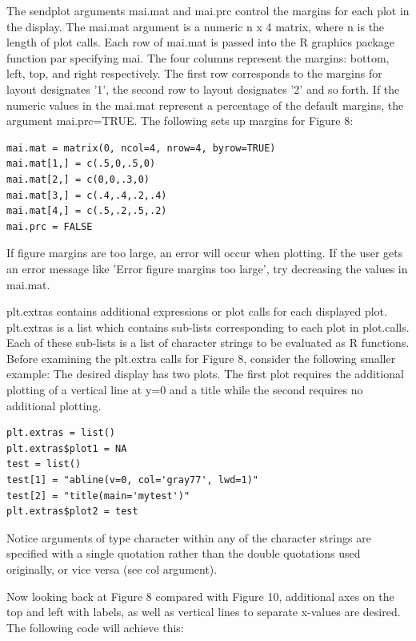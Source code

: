 \documentclass[]{article}
\begin{document}
\indent The sendplot arguments mai.mat and mai.prc control the margins for each plot in the display. The mai.mat argument is a numeric n x 4 matrix, where n is the length of plot calls. Each row of mai.mat is passed into the R graphics package function par specifying mai. The four columns represent the margins: bottom, left, top, and right respectively. The first row corresponds to the margins for layout designates '1', the second row to layout designates '2' and so forth. If the numeric values in the mai.mat represent a percentage of the default margins, the argument mai.prc=TRUE. The following sets up margins for Figure 8:
\begin{verbatim}
mai.mat = matrix(0, ncol=4, nrow=4, byrow=TRUE)
mai.mat[1,] = c(.5,0,.5,0)
mai.mat[2,] = c(0,0,.3,0)
mai.mat[3,] = c(.4,.4,.2,.4)
mai.mat[4,] = c(.5,.2,.5,.2)
mai.prc = FALSE
\end{verbatim}



 If figure margins are too large, an error will occur when plotting.  If the user gets an error message like 'Error figure margins too large', try decreasing the values in mai.mat.


\indent plt.extras contains additional expressions or plot calls for each displayed plot. plt.extras is a list which contains sub-lists corresponding to each plot in plot.calls. Each of these sub-lists is a list of character strings to be evaluated as R functions. Before examining the plt.extra calls for Figure 8, consider the following smaller example: The desired display has two plots. The first plot requires the additional plotting of a vertical line at y=0 and a title while the second requires no additional plotting.

\begin{verbatim}
plt.extras = list()
plt.extras$plot1 = NA
test = list()
test[1] = "abline(v=0, col='gray77', lwd=1)"
test[2] = "title(main='mytest')"
plt.extras$plot2 = test
\end{verbatim}  

\indent Notice arguments of type character within any of the character strings are specified with a single quotation rather than the double quotations used originally, or vice versa (see col argument).

\indent Now looking back at Figure 8 compared with Figure 10, additional axes on the top and left with labels, as well as vertical lines to separate x-values are desired. The following code will achieve this:  
\end{document}
